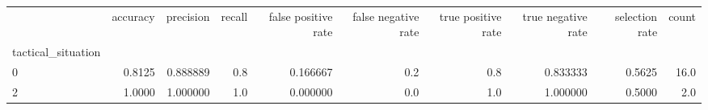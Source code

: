 \begin{tabular}{lrrrrrrrrr}
\toprule
{} &  accuracy &  precision &  recall &  false positive rate &  false negative rate &  true positive rate &  true negative rate &  selection rate &  count \\
tactical\_situation &           &            &         &                      &                      &                     &                     &                 &        \\
\midrule
0                  &    0.8125 &   0.888889 &     0.8 &             0.166667 &                  0.2 &                 0.8 &            0.833333 &          0.5625 &   16.0 \\
2                  &    1.0000 &   1.000000 &     1.0 &             0.000000 &                  0.0 &                 1.0 &            1.000000 &          0.5000 &    2.0 \\
\bottomrule
\end{tabular}
